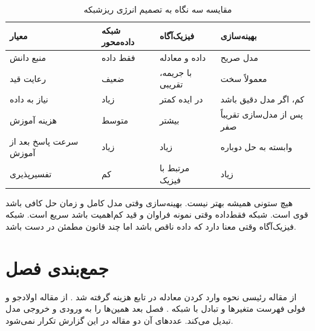 \begin{table}[H]
  \centering
  \caption{مقایسه سه نگاه به تصمیم انرژی ریزشبکه}
  \label{tab:comparison}
  \begin{tabular}{>{\centering\arraybackslash}p{}>{\centering\arraybackslash}p{}>{\centering\arraybackslash}p{}>{\centering\arraybackslash}p{}}
    \toprule
    \textbf{معیار} & \textbf{شبکه داده‌محور} & \textbf{فیزیک‌آگاه} & \textbf{بهینه‌سازی} \\
    \midrule
    منبع دانش & فقط داده & داده و معادله & مدل صریح \\
    رعایت قید & ضعیف & با جریمه، تقریبی & معمولاً سخت \\
    نیاز به داده & زیاد & در ایده کمتر & کم، اگر مدل دقیق باشد \\
    هزینه آموزش & متوسط & بیشتر & پس از مدل‌سازی تقریباً صفر \\
    سرعت پاسخ بعد از آموزش & زیاد & زیاد & وابسته به حل دوباره \\
    تفسیرپذیری & کم & مرتبط با فیزیک & زیاد \\
    \bottomrule
  \end{tabular}
\end{table}

هیچ ستونی همیشه بهتر نیست. بهینه‌سازی وقتی مدل کامل و زمان حل کافی باشد قوی است. شبکه فقط‌داده وقتی نمونه فراوان و قید کم‌اهمیت باشد سریع است. شبکه فیزیک‌آگاه وقتی معنا دارد که داده ناقص باشد اما چند قانون مطمئن در دست باشد.

\section{جمع‌بندی فصل}
از مقاله رئیسی نحوه وارد کردن معادله در تابع هزینه گرفته شد . از مقاله اولادجو و فولی فهرست متغیرها و تبادل با شبکه . فصل بعد همین‌ها را به ورودی و خروجی مدل تبدیل می‌کند. عددهای آن دو مقاله در این گزارش تکرار نمی‌شود.

